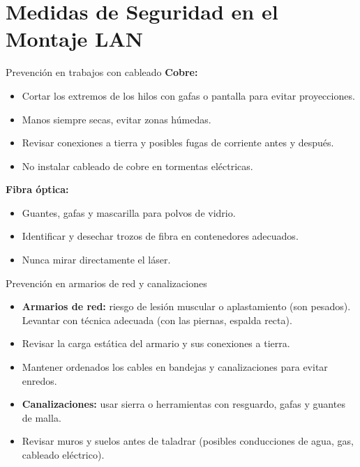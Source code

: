 \documentclass{beamer}
\begin{document}
\section{Medidas de Seguridad en el Montaje LAN}

\begin{frame}{Prevención en trabajos con cableado}
    \textbf{Cobre:}
    \begin{itemize}
        \item Cortar los extremos de los hilos con gafas o pantalla para evitar proyecciones.
        \item Manos siempre secas, evitar zonas húmedas.
        \item Revisar conexiones a tierra y posibles fugas de corriente antes y después.
        \item No instalar cableado de cobre en tormentas eléctricas.
    \end{itemize}
    \vspace{1em}
    \textbf{Fibra óptica:}
    \begin{itemize}
        \item Guantes, gafas y mascarilla para polvos de vidrio.
        \item Identificar y desechar trozos de fibra en contenedores adecuados.
        \item Nunca mirar directamente el láser.
    \end{itemize}
\end{frame}

\begin{frame}{Prevención en armarios de red y canalizaciones}
    \begin{itemize}
        \item \textbf{Armarios de red:} riesgo de lesión muscular o aplastamiento (son pesados). Levantar con técnica adecuada (con las piernas, espalda recta). 
        \item Revisar la carga estática del armario y sus conexiones a tierra.
        \item Mantener ordenados los cables en bandejas y canalizaciones para evitar enredos.
        \item \textbf{Canalizaciones:} usar sierra o herramientas con resguardo, gafas y guantes de malla. 
        \item Revisar muros y suelos antes de taladrar (posibles conducciones de agua, gas, cableado eléctrico).
    \end{itemize}
\end{frame}
\end{document}

